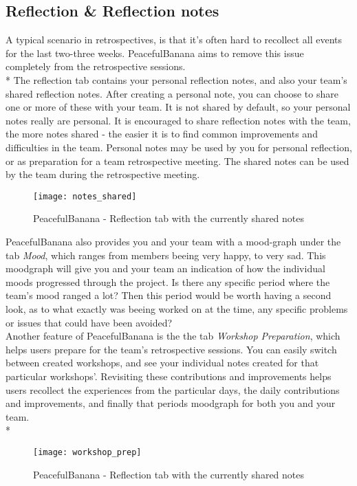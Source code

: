 %
%

\subsection{Reflection & Reflection notes}
A typical scenario in retrospectives, is that it's often hard to recollect all events for the last two-three weeks. PeacefulBanana aims to remove this issue completely from the retrospective sessions.\\*
The reflection tab contains your personal reflection notes, and also your team's shared reflection notes. After creating a personal note, you can choose to share one or more of these with your team. It is not shared by default, so your personal notes really are personal. It is encouraged to share reflection notes with the team, the more notes shared - the easier it is to find common improvements and difficulties in the team. Personal notes may be used by you for personal reflection, or as preparation for a team retrospective meeting. The shared notes can be used by the team during the retrospective meeting.\\
\begin{figure}[h!]
\label{milestonessingular}
\centering
	\texttt{[image: notes\_shared]}
\caption{PeacefulBanana - Reflection tab with the currently shared notes}
\end{figure}
PeacefulBanana also provides you and your team with a mood-graph under the tab \textit{Mood}, which ranges from members beeing very happy, to very sad. This moodgraph will give you and your team an indication of how the individual moods progressed through the project. Is there any specific period where the team's mood ranged a lot? Then this period would be worth having a second look, as to what exactly was beeing worked on at the time, any specific problems or issues that could have been avoided?\\

Another feature of PeacefulBanana is the the tab \textit{Workshop Preparation}, which helps users prepare for the team's retrospective sessions. You can easily switch between created workshops, and see your individual notes created for that particular workshops'. Revisiting these contributions and improvements helps users recollect the experiences from the particular days, the daily contributions and improvements, and finally that periods moodgraph for both you and your team.\\*
\begin{figure}[h!]
\label{milestonessingular}
\centering
	\texttt{[image: workshop\_prep]}
\caption{PeacefulBanana - Reflection tab with the currently shared notes}
\end{figure}

